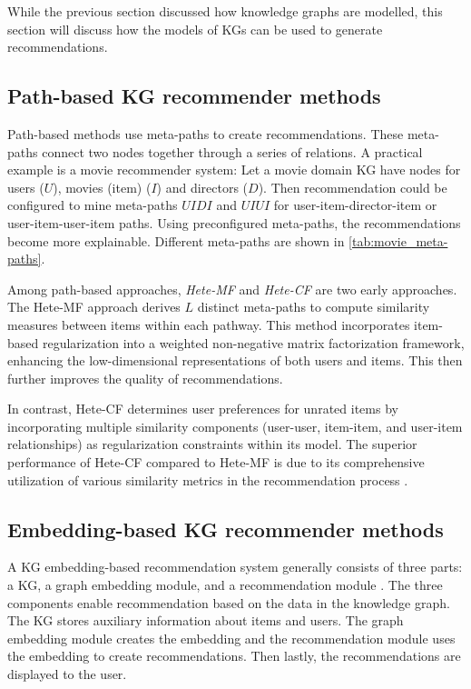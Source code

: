 \documentclass[english, 12pt, a4paper, sci, utf8, a-2b, online]{aaltothesis}
\begin{document}
While the previous section discussed how knowledge graphs are modelled, this section will discuss how the models of KGs can be used to generate recommendations.

\subsection{Path-based KG recommender methods}

Path-based methods use meta-paths to create recommendations. These meta-paths connect two nodes together through a series of relations. A practical example is a movie recommender system: Let a movie domain KG have nodes for users ($U$), movies (item) ($I$) and directors ($D$). Then recommendation could be configured to mine meta-paths $UIDI$ and $UIUI$ for user-item-director-item or user-item-user-item paths. Using preconfigured meta-paths, the recommendations become more explainable. Different meta-paths are shown in \autoref{tab:movie_meta-paths}.



Among path-based approaches, \textit{Hete-MF} \parencite{Yu2013CollaborativeFW} and \textit{Hete-CF} \parencite{luo2014hete} are two early approaches. The Hete-MF approach derives $L$ distinct meta-paths to compute similarity measures between items within each pathway. This method incorporates item-based regularization into a weighted non-negative matrix factorization framework, enhancing the low-dimensional representations of both users and items. This then further improves the quality of recommendations. 

In contrast, Hete-CF determines user preferences for unrated items by incorporating multiple similarity components (user-user, item-item, and user-item relationships) as regularization constraints within its model. The superior performance of Hete-CF compared to Hete-MF is due to its comprehensive utilization of various similarity metrics in the recommendation process \parencite{guo2020survey}.


\subsection{Embedding-based KG recommender methods}
\label{subsec:embedding-based_methods_recommendation}

A KG embedding-based recommendation system generally consists of three parts: a KG, a graph embedding module, and a recommendation module \parencite{ZHANG2024123876}. The three components enable recommendation based on the data in the knowledge graph. The KG stores auxiliary information about items and users. The graph embedding module creates the embedding and the recommendation module uses the embedding to create recommendations. Then lastly, the recommendations are displayed to the user. 
\end{document}
